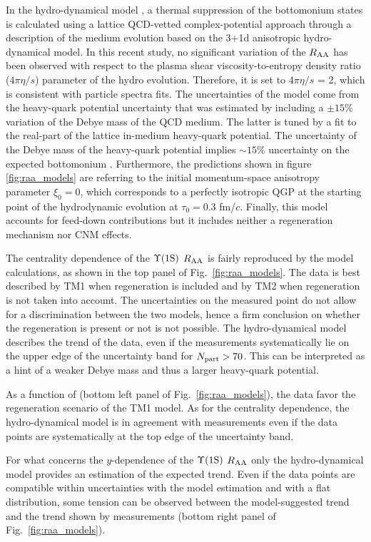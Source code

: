 In the hydro-dynamical model \cite{Krouppa:2017jlg}, a thermal suppression of the bottomonium states is calculated using a lattice QCD-vetted complex-potential approach through a description of the medium evolution based on the 3+1d anisotropic hydro-dynamical model.
 In this recent study, no significant variation of the $\mbox{$R_{\rm{AA}}$}$ has been observed with respect to the plasma shear viscosity-to-entropy density ratio ($4\pi\eta/s$) parameter of the hydro evolution. 
Therefore, it is set to $4\pi\eta/s$ = 2, which is consistent with particle spectra fits.
The uncertainties of the model come from the heavy-quark potential uncertainty that was estimated by including a $\pm 15\%$ variation of the Debye mass of the QCD medium.
The latter is tuned by a fit to the real-part of the lattice in-medium heavy-quark potential.
The uncertainty of the Debye mass of the heavy-quark potential implies $\sim15\%$ uncertainty on the expected bottomonium \raa. 
Furthermore, the predictions shown in figure \ref{fig:raa_models} are referring to the initial momentum-space anisotropy parameter $\xi_0=0$, which corresponds to a perfectly isotropic QGP at the starting point of the hydrodynamic evolution at $\tau_0=0.3$ fm/$c$.
Finally, this model accounts for feed-down contributions but it includes neither a regeneration mechanism nor CNM effects. 

The centrality dependence of the $\mbox{$\Upsilon$(1S)}$ $\mbox{$R_{\rm{AA}}$}$ is fairly reproduced by the model calculations, as shown in the top panel of Fig.~\ref{fig:raa_models}.
The data is best described by TM1 when regeneration is included and by TM2 when regeneration is not taken into account.
The uncertainties on the measured point do not allow for a discrimination between the two models, hence a firm conclusion on whether the regeneration is present or not is not possible. 
The hydro-dynamical model describes the trend of the data, even if the measurements systematically lie on the upper edge of the uncertainty band for $\mbox{$N_{\rm{part}}$}>70$.
This can be interpreted as a hint of a weaker Debye mass and thus a larger heavy-quark potential.

As a function of \pt (bottom left panel of Fig.~\ref{fig:raa_models}), the data favor the regeneration scenario of the TM1 model.
As for the centrality dependence, the hydro-dynamical model is in agreement with measurements even if the data points are systematically at the top edge of the uncertainty band.

For what concerns the $y$-dependence of the $\mbox{$\Upsilon$(1S)}$ $\mbox{$R_{\rm{AA}}$}$ only the hydro-dynamical model provides an estimation of the expected trend.
Even if the data points are compatible within uncertainties with the model estimation and with a flat distribution, some tension can be observed between the model-suggested trend and the trend shown by measurements (bottom right panel of Fig.~\ref{fig:raa_models}).

